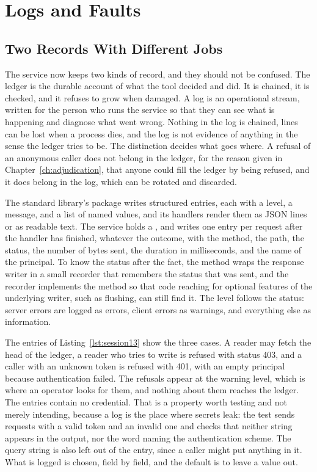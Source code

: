 \chapter{Logs and Faults}
\label{ch:faults}

\section{Two Records With Different Jobs}

The service now keeps two kinds of record, and they should not be confused. The ledger is the durable account of what the tool decided and did. It is chained, it is checked, and it refuses to grow when damaged. A log is an operational stream, written for the person who runs the service so that they can see what is happening and diagnose what went wrong. Nothing in the log is chained, lines can be lost when a process dies, and the log is not evidence of anything in the sense the ledger tries to be. The distinction decides what goes where. A refusal of an anonymous caller does not belong in the ledger, for the reason given in Chapter~\ref{ch:adjudication}, that anyone could fill the ledger by being refused, and it does belong in the log, which can be rotated and discarded.

The standard library's  package writes structured entries, each with a level, a message, and a list of named values, and its handlers render them as JSON lines or as readable text. The service holds a , and  writes one entry per request after the handler has finished, whatever the outcome, with the method, the path, the status, the number of bytes sent, the duration in milliseconds, and the name of the principal. To know the status after the fact, the method wraps the response writer in a small recorder that remembers the status that was sent, and the recorder implements the  method so that code reaching for optional features of the underlying writer, such as flushing, can still find it. The level follows the status: server errors are logged as errors, client errors as warnings, and everything else as information.



The entries of Listing~\ref{lst:session13} show the three cases. A reader may fetch the head of the ledger, a reader who tries to write is refused with status 403, and a caller with an unknown token is refused with 401, with an empty principal because authentication failed. The refusals appear at the warning level, which is where an operator looks for them, and nothing about them reaches the ledger. The entries contain no credential. That is a property worth testing and not merely intending, because a log is the place where secrets leak: the test sends requests with a valid token and an invalid one and checks that neither string appears in the output, nor the word naming the authentication scheme. The query string is also left out of the entry, since a caller might put anything in it. What is logged is chosen, field by field, and the default is to leave a value out.

